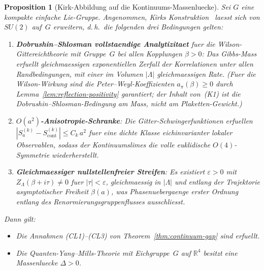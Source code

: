 \documentclass[12pt,a4paper]{article}
\theoremstyle{definition}
\theoremstyle{plain}
\newtheorem{proposition}[definition]{Proposition}
\theoremstyle{remark}
\begin{document}
\begin{proposition}[Kirk-Abbildung auf die Kontinuums-Massenluecke]
\label{prop:kirk-mapping}
Sei $G$ eine kompakte einfache Lie-Gruppe. Angenommen, Kirks
Konstruktion~\cite{Kirk2026,Kirk2026b} laesst sich von $SU(2)$ auf~$G$ erweitern,
d.\,h.\ die folgenden drei Bedingungen gelten:
\begin{enumerate}[label=\textup{(K\arabic*)}]
    \item \textbf{Dobrushin--Shlosman vollstaendige Analytizitaet} fuer die
        Wilson-Gittereichtheorie mit Gruppe~$G$ bei allen Kopplungen $\beta > 0$:
        Das Gibbs-Mass erfuellt gleichmaessigen exponentiellen Zerfall der
        Korrelationen unter allen Randbedingungen, mit einer im Volumen $|\Lambda|$
        gleichmaessigen Rate. (Fuer die Wilson-Wirkung sind die Peter--Weyl-Koeffizienten
        $a_\pi(\beta) \geq 0$ durch Lemma~\ref{lem:reflection-positivity} garantiert;
        der Inhalt von~\textup{(K1)} ist die Dobrushin--Shlosman-Bedingung am
        \emph{Mass}, nicht am Plaketten-Gewicht.)
    \item \textbf{$O(a^2)$-Anisotropie-Schranke}: Die Gitter-Schwingerfunktionen
        erfuellen $|S^{(k)}_a - S^{(k)}_{\mathrm{cont}}| \leq C_k\,a^2$ fuer
        eine dichte Klasse eichinvarianter lokaler Observablen, sodass
        der Kontinuumslimes die volle euklidische $O(4)$-Symmetrie wiederherstellt.
    \item \textbf{Gleichmaessiger nullstellenfreier Streifen}: Es existiert $\varepsilon > 0$
        mit $Z_\Lambda(\beta + i\tau) \neq 0$ fuer $|\tau| < \varepsilon$,
        gleichmaessig in $|\Lambda|$ und entlang der Trajektorie asymptotischer
        Freiheit $\beta(a)$, was Phasenuebergaenge erster Ordnung entlang des
        Renormierungsgruppenflusses ausschliesst.
\end{enumerate}
Dann gilt:
\begin{itemize}
    \item[\textup{(a)}] Die Annahmen \textup{(CL1)--(CL3)} von
        Theorem~\ref{thm:continuum-gap} sind erfuellt.
    \item[\textup{(b)}] Die Quanten-Yang--Mills-Theorie mit Eichgruppe~$G$
        auf $\mathbb{R}^4$ besitzt eine Massenluecke $\Delta > 0$.
\end{itemize}
\end{proposition}
\end{document}
